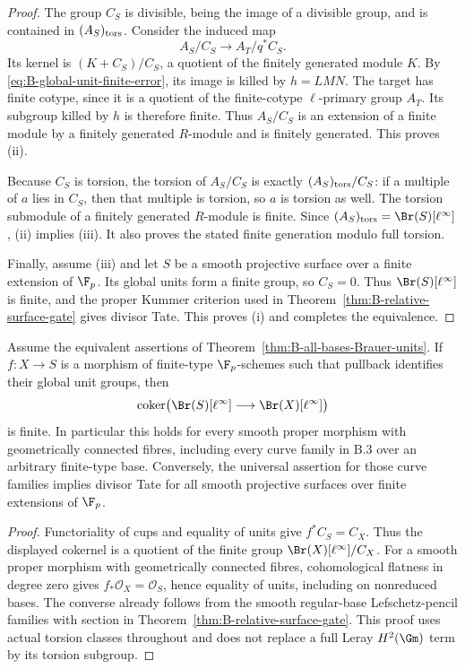 \begin{proof}
The group \(C_S\) is divisible, being the image of a
divisible group, and is contained in \((A_S)_{\rm tors}\).
Consider the induced map
\[
       A_S/C_S\longrightarrow A_T/q^*C_S.
\]
Its kernel is \((K+C_S)/C_S\), a quotient of the
finitely generated module \(K\).  By
\eqref{eq:B-global-unit-finite-error}, its image is killed
by \(h=LMN\).  The target has finite cotype, since it is
a quotient of the finite-cotype \(\ell\)-primary group
\(A_T\).  Its subgroup killed by \(h\) is therefore
finite.  Thus \(A_S/C_S\) is an extension of a finite
module by a finitely generated \(R\)-module and is
finitely generated.  This proves (ii).

Because \(C_S\) is torsion, the torsion of \(A_S/C_S\)
is exactly \((A_S)_{\rm tors}/C_S\): if a multiple of
\(a\) lies in \(C_S\), then that multiple is torsion,
so \(a\) is torsion as well.  The torsion submodule of
a finitely generated \(R\)-module is finite.  Since
\((A_S)_{\rm tors}=\Br(S)[\ell^\infty]\), (ii)
implies (iii).  It also proves the stated finite generation
modulo full torsion.

Finally, assume (iii) and let \(S\) be a smooth projective
surface over a finite extension of \(\F_p\).
Its global units form a finite group, so \(C_S=0\).
Thus \(\Br(S)[\ell^\infty]\) is finite, and the
proper Kummer criterion used in
Theorem~\ref{thm:B-relative-surface-gate} gives divisor Tate.
This proves (i) and completes the equivalence.
\end{proof}

\begin{corollary}
\label{cor:B-all-bases-relative-Brauer}
Assume the equivalent assertions of
Theorem~\ref{thm:B-all-bases-Brauer-units}.
If \(f:X\to S\) is a morphism of finite-type
\(\F_p\)-schemes such that pullback identifies their
global unit groups, then
\[
 \operatorname{coker}\bigl(
       \Br(S)[\ell^\infty]\longrightarrow
       \Br(X)[\ell^\infty]\bigr)
\]
is finite.  In particular this holds for every smooth proper
morphism with geometrically connected fibres, including every
curve family in B.3 over an arbitrary finite-type base.
Conversely, the universal assertion for those curve families
implies divisor Tate for all smooth projective surfaces over
finite extensions of \(\F_p\).
\end{corollary}
\begin{proof}
Functoriality of cups and equality of units give
\(f^*C_S=C_X\).  Thus the displayed cokernel is a
quotient of the finite group
\(\Br(X)[\ell^\infty]/C_X\).
For a smooth proper morphism with geometrically connected
fibres, cohomological flatness in degree zero gives
\(f_*\mathcal O_X=\mathcal O_S\), hence equality of
units, including on nonreduced bases.  The converse already
follows from the smooth regular-base Lefschetz-pencil
families with section in
Theorem~\ref{thm:B-relative-surface-gate}.
This proof uses actual torsion classes throughout and does
not replace a full Leray \(H^2(\Gm)\) term by its
torsion subgroup.
\end{proof}
